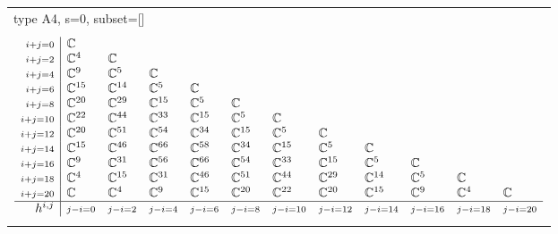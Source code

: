 \documentclass[crop,border=2mm]{standalone}
\begin{document}
\begin{tabular}{l}
{\huge type A4, s=0, subset=[]}\\ \\


$\displaystyle
\begin{array}{r|l l l l l l l l l l l}
	{\scriptstyle i+j=0}&\mathbb{C}&&&&&&&&&&\\
	{\scriptstyle i+j=2}&\mathbb{C}^{4}&\mathbb{C}&&&&&&&&&\\
	{\scriptstyle i+j=4}&\mathbb{C}^{9}&\mathbb{C}^{5}&\mathbb{C}&&&&&&&&\\
	{\scriptstyle i+j=6}&\mathbb{C}^{15}&\mathbb{C}^{14}&\mathbb{C}^{5}&\mathbb{C}&&&&&&&\\
	{\scriptstyle i+j=8}&\mathbb{C}^{20}&\mathbb{C}^{29}&\mathbb{C}^{15}&\mathbb{C}^{5}&\mathbb{C}&&&&&&\\
	{\scriptstyle i+j=10}&\mathbb{C}^{22}&\mathbb{C}^{44}&\mathbb{C}^{33}&\mathbb{C}^{15}&\mathbb{C}^{5}&\mathbb{C}&&&&&\\
	{\scriptstyle i+j=12}&\mathbb{C}^{20}&\mathbb{C}^{51}&\mathbb{C}^{54}&\mathbb{C}^{34}&\mathbb{C}^{15}&\mathbb{C}^{5}&\mathbb{C}&&&&\\
	{\scriptstyle i+j=14}&\mathbb{C}^{15}&\mathbb{C}^{46}&\mathbb{C}^{66}&\mathbb{C}^{58}&\mathbb{C}^{34}&\mathbb{C}^{15}&\mathbb{C}^{5}&\mathbb{C}&&&\\
	{\scriptstyle i+j=16}&\mathbb{C}^{9}&\mathbb{C}^{31}&\mathbb{C}^{56}&\mathbb{C}^{66}&\mathbb{C}^{54}&\mathbb{C}^{33}&\mathbb{C}^{15}&\mathbb{C}^{5}&\mathbb{C}&&\\
	{\scriptstyle i+j=18}&\mathbb{C}^{4}&\mathbb{C}^{15}&\mathbb{C}^{31}&\mathbb{C}^{46}&\mathbb{C}^{51}&\mathbb{C}^{44}&\mathbb{C}^{29}&\mathbb{C}^{14}&\mathbb{C}^{5}&\mathbb{C}&\\
	{\scriptstyle i+j=20}&\mathbb{C}&\mathbb{C}^{4}&\mathbb{C}^{9}&\mathbb{C}^{15}&\mathbb{C}^{20}&\mathbb{C}^{22}&\mathbb{C}^{20}&\mathbb{C}^{15}&\mathbb{C}^{9}&\mathbb{C}^{4}&\mathbb{C}\\
	\hline h^{i,j}&{\scriptstyle j-i=0}&{\scriptstyle j-i=2}&{\scriptstyle j-i=4}&{\scriptstyle j-i=6}&{\scriptstyle j-i=8}&{\scriptstyle j-i=10}&{\scriptstyle j-i=12}&{\scriptstyle j-i=14}&{\scriptstyle j-i=16}&{\scriptstyle j-i=18}&{\scriptstyle j-i=20}
\end{array}
$ \\ \\



\end{tabular}
\end{document}

